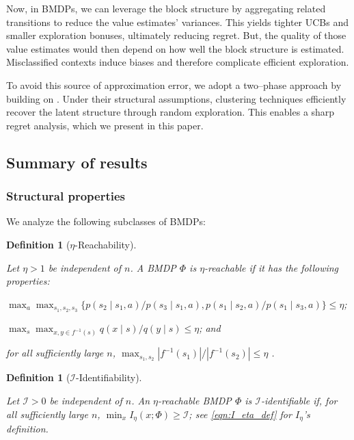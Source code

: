 \documentclass[11pt]{article}
\newcommand{\mcI}{\mathcal{I}}
\newtheorem{definition}[theorem]{Definition}
\theoremstyle{definition}
\theoremstyle{definition}
\begin{document}
Now, in \glspl{BMDP}, we can leverage the block structure by aggregating related transitions to reduce the value estimates' variances.
This yields tighter \glspl{UCB} and smaller exploration bonuses, ultimately reducing regret.
But, the quality of those value estimates would then depend on how well the block structure is estimated.
Misclassified contexts induce biases and therefore complicate efficient exploration.

To avoid this source of approximation error, we adopt a two--phase approach by building on \cite{Jedra:2022}.
Under their structural assumptions, clustering techniques efficiently recover the latent structure through random exploration.
This enables a sharp regret analysis, which we present in this paper.

\subsection{Summary of results}
\label{sec:summary_of_main_results}

\subsubsection{Structural properties}

We analyze the following subclasses of \glspl{BMDP}:

\begin{definition}[$\eta$-Reachability]
	\label{def:reachability}

	Let $\eta>1$ be independent of $n$.
	A \gls{BMDP} $\Phi$ is $\eta$-reachable if it has the following properties:
	\begin{definitionenum}
		\item \label{def:reachability:p}
		$
			\max_{a}
			\max_{s_1,s_2,s_3}
			\{ p(s_2\mid s_1,a) / p(s_3\mid s_1,a), p(s_1\mid s_2,a) / p(s_1\mid s_3,a) \}
			\leq
			\eta
		$;
		\item \label{def:reachability:q}
		$
			\max_{s}
			\max_{x,y\in f^{-1}(s)}
			q(x\mid s)/q(y\mid s)
			\leq
			\eta
		$; and
		\item \label{def:reachability:f}
		for all sufficiently large $n$,
		$
			\max_{s_1,s_2}
			|f^{-1}(s_1)|/|f^{-1}(s_2)|
			\leq
			\eta
		$
		.
	\end{definitionenum}
\end{definition}

\begin{definition}[$\mcI$-Identifiability]
	\label{def:identifiability}

	Let $\mcI>0$ be independent of $n$.
	An $\eta$-reachable \gls{BMDP} $\Phi$ is $\mcI$-identifiable if, for all sufficiently large $n$, $\min_{x}I_{\eta}(x;\Phi) \allowbreak \geq \allowbreak \mcI$; see \eqref{eqn:I_eta_def} for $I_\eta$'s definition.
\end{definition}
\end{document}
